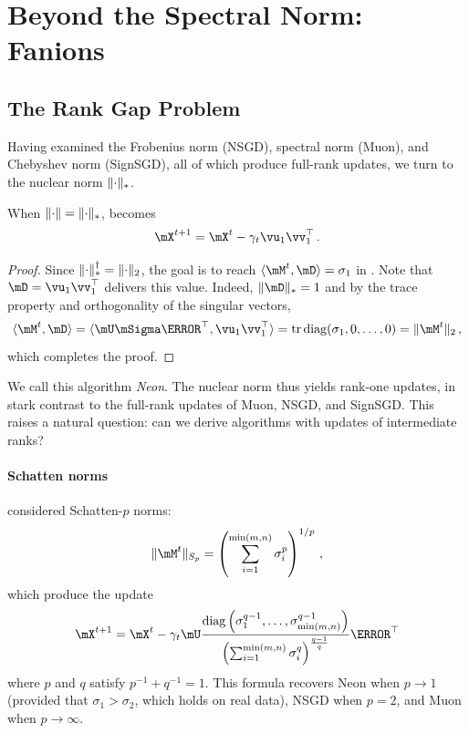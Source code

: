 \documentclass[pmlr]{jmlr}%
\newcommand{\norm}[1]{\lVert #1\rVert}
\DeclarePairedDelimiter{\norms}{\|}{\|_{\mathrm{2}}}
\DeclarePairedDelimiter{\normn}{\|}{\|_{*}}
\def\<#1,#2>{\langle #1,#2\rangle}
\DeclareMathOperator{\tr}{tr}
\DeclareMathOperator{\diag}{diag}
\begin{document}
 \section{Beyond the Spectral Norm: Fanions}
 
 \subsection{The Rank Gap Problem}
 
 Having examined the Frobenius norm (NSGD), spectral norm (Muon), and Chebyshev norm (SignSGD), all of which produce full-rank updates, we turn to the nuclear norm $\normn{\cdot}$.
 
 \begin{lemma}\label{lemma:neon_update}
   When $\norm{\cdot} = \normn{\cdot}$,  becomes
   \begin{equation}\label{eq:neon_update}
     \mX^{t+1} = \mX^{t} - \gamma_t \vu_1 \vv_1^\top\,.
   \end{equation}
 \end{lemma}
 \begin{proof}
 Since $\normn{\cdot}^\dagger = \norms{\cdot}$, the goal is to reach $\<\mM^t, \mD> = \sigma_1$ in . Note that $\mD = \vu_1 \vv_1^\top$ delivers this value. Indeed, $\normn{\mD}=1$ and by the trace property and orthogonality of the singular vectors,
 \[
 \<\mM^t, \mD> =\<\mU \mSigma \mV^\top, \vu_1 \vv_1^\top> = \tr \diag({\sigma_1, 0, \dots, 0}) = \norms{\mM^t}\,,
 \]
 which completes the proof.
 \end{proof}
 
 We call this algorithm \emph{Neon}. The nuclear norm thus yields rank-one updates, in stark contrast to the full-rank updates of Muon, NSGD, and SignSGD. This raises a natural question: can we derive algorithms with updates of intermediate ranks?
 
 \paragraph{Schatten norms}
 \citep{cesista2025schattenp} considered Schatten-$p$ norms:
 \[\norm{\mM^t}_{S_p} = \left(\sum_{i=1}^{\min(m, n)}\sigma_i^p\right)^{1/p}\,,
 \]
 which produce the update
 \[
 \mX^{t+1} = \mX^t - \gamma_t \mU \frac{\diag\left(\sigma_1^{q-1},\dots, \sigma_{\min(m,n)}^{q-1}\right)}{\left(\sum_{i=1}^{\min(m,n)}{\sigma_i^q}\right)^{\frac{q-1}{q}}}\mV^\top
 \]
 where $p$ and $q$ satisfy $p^{-1} + q^{-1} = 1$. This formula recovers Neon when $p\rightarrow1$ (provided that $\sigma_1 > \sigma_2$, which holds on real data), NSGD when $p=2$, and Muon when $p\rightarrow\infty$.
 
\end{document}
